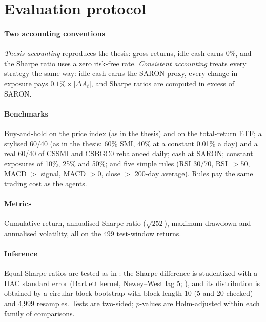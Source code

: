 \documentclass[11pt,a4paper]{article}
\begin{document}
\section{Evaluation protocol}

\paragraph{Two accounting conventions}
\emph{Thesis accounting} reproduces the thesis: gross returns, idle cash earns 0\%, and the Sharpe ratio uses a zero risk-free rate. \emph{Consistent accounting} treats every strategy the same way: idle cash earns the SARON proxy, every change in exposure pays $0.1\%\times|\Delta A_t|$, and Sharpe ratios are computed in excess of SARON.

\paragraph{Benchmarks} Buy-and-hold on the price index (as in the thesis) and on the total-return ETF; a stylised 60/40 (as in the thesis: 60\% SMI, 40\% at a constant 0.01\% a day) and a real 60/40 of CSSMI and CSBGC0 rebalanced daily; cash at SARON; constant exposures of 10\%, 25\% and 50\%; and five simple rules (RSI 30/70, RSI~$>50$, MACD $>$ signal, MACD $>0$, close $>$ 200-day average). Rules pay the same trading cost as the agents.

\paragraph{Metrics} Cumulative return, annualised Sharpe ratio ($\sqrt{252}$), maximum drawdown and annualised volatility, all on the 499 test-window returns.

\paragraph{Inference} Equal Sharpe ratios are tested as in \citet{ledoit2008}: the Sharpe difference is studentized with a HAC standard error (Bartlett kernel, Newey--West lag 5; \citealp{newey1987}), and its distribution is obtained by a circular block bootstrap \citep{politis1992} with block length 10 (5 and 20 checked) and 4,999 resamples. Tests are two-sided; $p$-values are Holm-adjusted within each family of comparisons.
\end{document}

